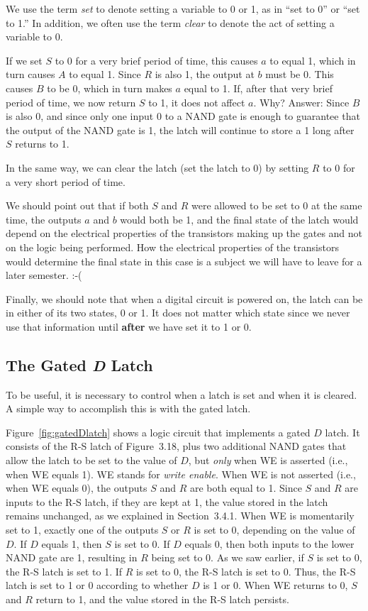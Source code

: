 \documentclass{patt}
\begin{document}
We use the term {\em set} to denote setting a variable to 0 or 1, as
 in ``set to 0'' or ``set to 1.''  In addition,
we often use the term {\em clear } to denote the act of setting a
variable to 0.  

If we set $S$ to $0$ for a very brief period of time, this causes  $a$ 
to equal 1, which in turn causes $A$ to equal 1.  Since $R$ is also 1, 
the output at $b$ must be 0.  This causes $B$ to be 0, which in turn makes 
$a$ equal to 1.  If, after that very brief period of time, we now return $S$ 
to 1, it does not affect $a$.  Why?  Answer: Since $B$ is also 0, and since
only one input $0$ to a NAND gate is enough to guarantee that the output of 
the NAND gate is 1, the latch will continue to store a 1 long after $S$ 
returns to 1.

In the same way, we can clear the latch (set the latch to 0) by
setting $R$ to 0 for a very short period of time.

We should point out that if both $S$ and $R$ were allowed to be set to 0 
at the same time, the outputs $a$ and $b$ would both be 1, and the final 
state of the latch would depend on the electrical properties of the 
transistors making up the gates and not on the logic being performed.  
How the electrical
properties of the transistors would determine the final state in this
case is a subject we will have to leave for a later semester.  :-(

Finally, we should note that when a digital circuit is powered on, the latch
can be in either of its two states, 0 or 1.  It does not matter which state
since we never use that information until {\bf after} we have set it to 1 or 0.

\FloatBarrier
\subsection{The Gated {\itshape D} Latch}
\label{sec:gated_latch}
To be useful, it is necessary to control when a latch is set and when
it is cleared.  A simple way to accomplish this is with the gated
latch.

Figure~\ref{fig:gatedDlatch} shows a logic circuit that implements a gated 
$D$ latch.  It consists of the R-S latch of Figure~3.18, plus two additional 
NAND gates that allow the latch to be set to the value of $D$, but {\em only}
when WE is asserted (i.e., when WE equals 1).  WE stands for 
{\em write enable}.  When WE is
not asserted (i.e., when WE equals 0), the outputs $S$ and $R$ are
both equal to 1.  Since $S$ and $R$ are inputs to the R-S latch,
if they are kept at 1, the value stored in the latch remains
unchanged, as we explained in Section~3.4.1.  
When WE is momentarily set to 1, exactly one of the
outputs $S$ or $R$ is set to 0, depending on the value of $D$.  If $D$
equals 1, then $S$ is set to 0.  If $D$ equals 0, then both inputs to
the lower NAND gate are 1, resulting in $R$ being set to 0.  As we saw
earlier, if $S$ is set to 0, the R-S latch is set to 1.  If $R$ is set
to 0, the R-S latch is set to 0.  Thus, the R-S latch is set to 1 or 0
according to whether $D$ is 1 or 0.  When WE returns to 0, $S$ and $R$
return to 1, and the value stored in the R-S latch persists.
\end{document}
